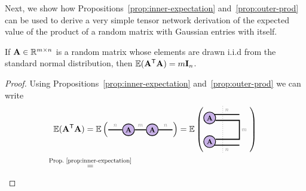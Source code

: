 Next, we show how Propositions~\ref{prop:inner-expectation} and~\ref{prop:outer-prod} can be used to derive a very simple tensor network derivation of the expected value of the product of a random matrix with Gaussian entries with itself. 
\begin{proposition}\label{prop:wishart-mean}
If $\mathbf{A}\in\mathbb{R}^{m\times n}$ is a random matrix whose elements are drawn i.i.d from the standard normal distribution, then $\mathbb{E}(\mathbf{A}^{\mathsf{T}}\mathbf{A}) = m\mathbf{I}_n$. 
\begin{proof}
        Using Propositions~\ref{prop:inner-expectation} and~\ref{prop:outer-prod} we can write 
\begin{align*}
\EE(\Ab^\ts\Ab) 
&= 
\EE\left(\begin{tikzpicture}[baseline=\baseline]
    \tikzset{tensor/.style = {minimum size = 0.5cm,shape = circle,thick,draw=black,inner sep = 0pt}, edge/.style = {thick,line width=.4mm},every loop/.style={}}
    \def\y{0}
    \def\x{0}
    \node[tensor,fill=red!30!blue!30!white] (A1) at (\x,\y){\scalebox{0.85}{$\Ab$}};
    \node[tensor,fill=red!30!blue!30!white] (A2) at (\x+1,\y){\scalebox{0.85}{$\Ab$}};
    \draw[edge](A1) -- (A2) node [midway, above]{\scalebox{0.7}{\dimcolor{$m$}}};
    \draw[edge](A1) -- (\x-0.85,\y) node [midway, above]{\scalebox{0.7}{\dimcolor{$n$}}};
    \draw[edge](A2) -- (\x+1.85,\y) node [midway, above]{\scalebox{0.7}{\dimcolor{$n$}}};
\end{tikzpicture}\right)
=
\EE\left(\begin{tikzpicture}[baseline=\baseline]
    \tikzset{tensor/.style = {minimum size = 0.5cm,shape = circle,thick,draw=black,inner sep = 0pt}, edge/.style = {thick,line width=.4mm},every loop/.style={}}
    \def\y{0}
    \def\x{0}
    \node[tensor,fill=red!30!blue!30!white] (A2) at (\x,\y-0.5){\scalebox{0.85}{$\Ab$}};
    \node[tensor,fill=red!30!blue!30!white] (A1) at (\x,\y+0.5){\scalebox{0.85}{$\Ab$}};
    \draw[edge](\x+0.25,\y+0.4) -- (\x+1.25,\y+0.4) -- (\x+1.25,\y-0.4) -- (\x+0.25,\y-0.4);
    \draw[edge](\x+0.2,\y+0.65)--(\x+1.25,\y+0.65)node [midway, above]{\scalebox{0.7}{\dimcolor{$n$}}};
    \draw[edge](\x+0.2,\y-0.65)--(\x+1.25,\y-0.65)node [midway, below]{\scalebox{0.7}{\dimcolor{$n$}}};
    \node[draw=none] () at (\x+1.45,\y) {\scalebox{0.7}{\dimcolor{$m$}}};
    \draw[dotted](\x+0.55,\y+1)--(\x+0.55,\y-1);
\end{tikzpicture}\right)\\
\ \
&\textequal{Prop.~\ref{prop:inner-expectation}}
\ \
\begin{tikzpicture}[baseline=\baseline]

\end{tikzpicture}
\end{align*}
\end{proof}
\end{proposition}
